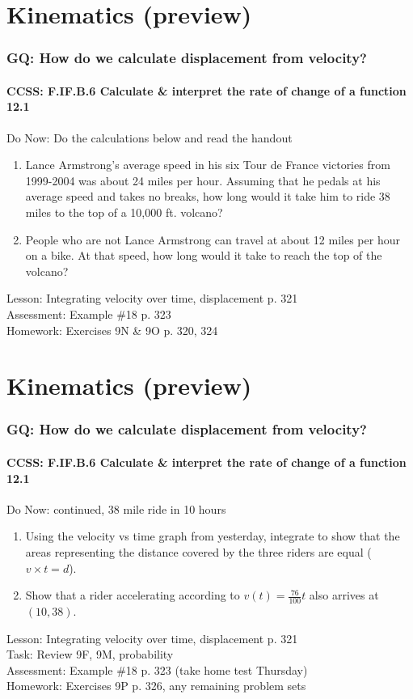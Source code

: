 \documentclass{beamer}
\begin{document}
\section{Kinematics (preview)}
  \frame
  {
    \frametitle{GQ: How do we calculate displacement from velocity?}
    \framesubtitle{CCSS: F.IF.B.6 Calculate \& interpret the rate of change of a function \qquad \alert{12.1}}

    \begin{block}{Do Now: Do the calculations below and read the handout}
    \begin{enumerate}
        \item Lance Armstrong’s average speed in his six Tour de France victories from 1999-2004 was about 24 miles per hour. Assuming that he pedals at his average speed and takes no breaks, how long would it take him to ride 38 miles to the top of a 10,000 ft. volcano?
        \item People who are not Lance Armstrong can travel at about 12 miles per hour on a bike. At that speed, how long would it take to reach the top of the volcano?
    \end{enumerate}
    \end{block}
    Lesson: Integrating velocity over time, displacement p. 321\\%
    Assessment: Example \#18 p. 323 \\%
    Homework: Exercises 9N \& 9O p. 320, 324
  }

\section{Kinematics (preview)}
  \frame
  {
    \frametitle{GQ: How do we calculate displacement from velocity?}
    \framesubtitle{CCSS: F.IF.B.6 Calculate \& interpret the rate of change of a function \qquad \alert{12.1}}

    \begin{block}{Do Now: continued, 38 mile ride in 10 hours}
    \begin{enumerate}
        \item Using the velocity vs time graph from yesterday, integrate to show that the areas representing the distance covered by the three riders are equal ($v \times t = d$).
        \item Show that a rider accelerating according to $v(t)= \frac{76}{100}t$ also arrives at $(10,38)$.
    \end{enumerate}
    \end{block}
    Lesson: Integrating velocity over time, displacement p. 321\\%
    Task: Review 9F, 9M, probability\\%
    Assessment: Example \#18 p. 323 (take home test Thursday)\\%
    Homework: Exercises 9P p. 326, any remaining problem sets
  }
\end{document}
